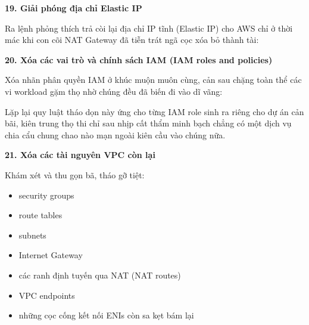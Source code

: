 \vspace{0.5em}\noindent\textbf{19. Giải phóng địa chỉ Elastic
IP}\par

Ra lệnh phỏng thích trả còi lại địa chỉ IP tĩnh (Elastic IP) cho AWS chỉ
ở thời mác khi con cõi NAT Gateway đã tiễn trát ngã cọc xóa bỏ thành
tài:

\begin{Shaded}
\begin{Highlighting}[]
 \OperatorTok{\textless{}}\OperatorTok{\textgreater{}}
\end{Highlighting}
\end{Shaded}

\vspace{0.5em}\noindent\textbf{20. Xóa các vai trò và chính sách IAM (IAM roles and
policies)}\par

Xóa nhãn phân quyền IAM ở khúc muộn muôn cùng, cản sau chặng toàn thể
các vi workload gặm thọ nhờ chúng đều đã biến đi vào dĩ vãng:

\begin{Shaded}
\begin{Highlighting}[]
 \OperatorTok{\textless{}}\OperatorTok{\textgreater{}}
\end{Highlighting}
\end{Shaded}

Lặp lại quy luật tháo dọn này ứng cho từng IAM role sinh ra riêng cho dự
án cản bãi, kiên trung thọ thi chỉ sau nhịp cất thẩm minh bạch chẳng có
một dịch vụ chia cẩu chung chao nào mạn ngoài kiên cầu vào chúng nữa.

\vspace{0.5em}\noindent\textbf{21. Xóa các tài nguyên VPC còn
lại}\par

Khám xét và thu gọn bã, tháo gỡ tiệt:

\begin{itemize}
\tightlist
\item
  security groups
\item
  route tables
\item
  subnets
\item
  Internet Gateway
\item
  các ranh định tuyến qua NAT (NAT routes)
\item
  VPC endpoints
\item
  những cọc cống kết nối ENIs còn sa kẹt bám lại
\end{itemize}

